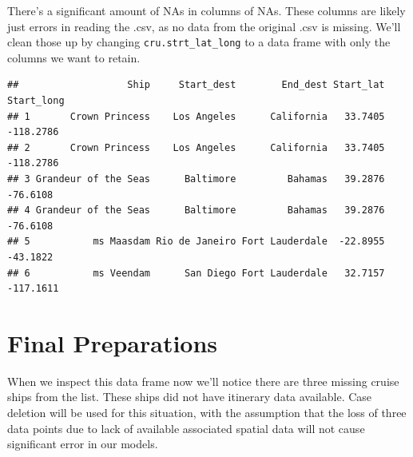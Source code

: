\documentclass[
  11,
]{book}
\newenvironment{Shaded}{\begin{snugshade}}{\end{snugshade}}
\newcommand{\AttributeTok}[1]{\textcolor[rgb]{0.27,0.27,0.27}{#1}}
\newcommand{\FunctionTok}[1]{\textcolor[rgb]{0.27,0.27,0.27}{\textbf{#1}}}
\newcommand{\NormalTok}[1]{#1}
\newcommand{\OtherTok}[1]{\textcolor[rgb]{0.37,0.37,0.37}{#1}}
\newcommand{\SpecialCharTok}[1]{\textcolor[rgb]{0.43,0.43,0.43}{\textbf{#1}}}
\begin{document}
There's a significant amount of NAs in columns of NAs. These columns are likely just errors in reading the .csv, as no data from the original .csv is missing. We'll clean those up by changing \texttt{cru.strt\_lat\_long} to a data frame with only the columns we want to retain.

\begin{Shaded}
\end{Shaded}

\begin{verbatim}
##                   Ship     Start_dest        End_dest Start_lat Start_long
## 1       Crown Princess    Los Angeles      California   33.7405  -118.2786
## 2       Crown Princess    Los Angeles      California   33.7405  -118.2786
## 3 Grandeur of the Seas      Baltimore         Bahamas   39.2876   -76.6108
## 4 Grandeur of the Seas      Baltimore         Bahamas   39.2876   -76.6108
## 5           ms Maasdam Rio de Janeiro Fort Lauderdale  -22.8955   -43.1822
## 6           ms Veendam      San Diego Fort Lauderdale   32.7157  -117.1611
\end{verbatim}

\hypertarget{final-preparations}{%
\section*{Final Preparations}\label{final-preparations}}


When we inspect this data frame now we'll notice there are three missing cruise ships from the list. These ships did not have itinerary data available. Case deletion will be used for this situation, with the assumption that the loss of three data points due to lack of available associated spatial data will not cause significant error in our models.
\end{document}
